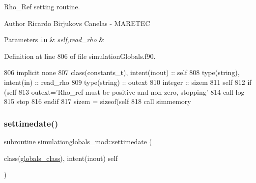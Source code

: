 Rho\+\_\+\+Ref setting routine. 

\begin{DoxyAuthor}{Author}
Ricardo Birjukovs Canelas -\/ M\+A\+R\+E\+T\+EC 
\end{DoxyAuthor}

\begin{DoxyParams}[1]{Parameters}
\mbox{\tt in}  & {\em self,read\+\_\+rho} & \\
\hline
\end{DoxyParams}


Definition at line 806 of file simulation\+Globals.\+f90.


\begin{DoxyCode}
806     \textcolor{keywordtype}{implicit none}
807     \textcolor{keywordtype}{class}(constants\_t), \textcolor{keywordtype}{intent(inout)} :: self
808     \textcolor{keywordtype}{type}(string), \textcolor{keywordtype}{intent(in)} :: read\_rho
809     \textcolor{keywordtype}{type}(string) :: outext
810     \textcolor{keywordtype}{integer} :: sizem
811     self%
812     \textcolor{keywordflow}{if} (self%
813         outext=\textcolor{stringliteral}{'Rho\_ref must be positive and non-zero, stopping'}
814         \textcolor{keyword}{call }log%
815         stop
816 \textcolor{keywordflow}{    endif}
817     sizem = sizeof(self%
818     \textcolor{keyword}{call }simmemory%
\end{DoxyCode}
\mbox{\label{namespacesimulationglobals__mod_aefda4344f03a705055ad6cb97cb90c65}} 
\subsubsection{\texorpdfstring{settimedate()}{settimedate()}}
{\footnotesize\ttfamily subroutine simulationglobals\+\_\+mod\+::settimedate (\begin{DoxyParamCaption}\item[{class(\mbox{\hyperlink{structsimulationglobals__mod_1_1globals__class}{globals\+\_\+class}}), intent(inout)}]{self }\end{DoxyParamCaption})\hspace{0.3cm}{\ttfamily [private]}}



